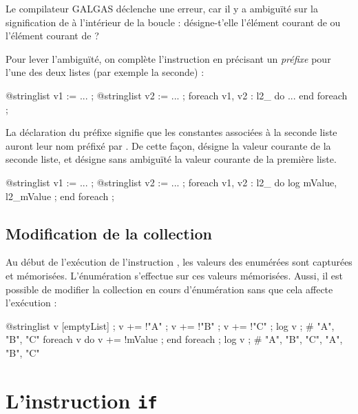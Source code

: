 Le compilateur GALGAS déclenche une erreur, car il y a ambiguïté sur la signification de  à l'intérieur de la boucle : désigne-t'elle l'élément courant de  ou l'élément courant de  ?

Pour lever l'ambiguïté, on complète l'instruction en précisant un \emph{préfixe} pour l'une des deux listes (par exemple la seconde) :
\begin{galgascode}
@stringlist v1 := ... ;
@stringlist v2 := ... ;
foreach v1, v2 : l2_ do
  ...
end foreach ;
\end{galgascode}

La déclaration du préfixe  signifie que les constantes associées à la seconde liste auront leur nom préfixé par . De cette façon,  désigne la valeur courante de la seconde liste, et  désigne sans ambiguïté la valeur courante de la première liste.
\begin{galgascode}
@stringlist v1 := ... ;
@stringlist v2 := ... ;
foreach v1, v2 : l2_ do
  log mValue, l2_mValue ;
end foreach ;
\end{galgascode}

\subsection{Modification de la collection}

Au début de l'exécution de l'instruction , les valeurs des  enumérées sont capturées et mémorisées. L'énumération s'effectue sur ces valeurs mémorisées. Aussi, il est possible de modifier la collection en cours d'énumération sans que cela affecte l'exécution :
\begin{galgascode}
@stringlist v [emptyList] ;
v += !"A" ;
v += !"B" ;
v += !"C" ;
log v ; # "A", "B", "C"
foreach v do
  v += !mValue ;
end foreach ;
log v ; # "A", "B", "C", "A", "B", "C"
\end{galgascode}















\section{L'instruction \texttt{if}}



